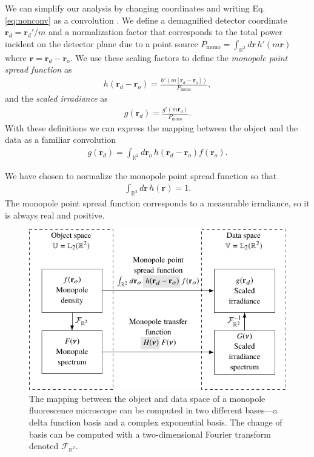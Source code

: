 \documentclass[]{osa-article}
\providecommand{\mb}[1]{\mathbf{#1}}
\providecommand{\ro}{\mathbf{\mathbf{r}}_o}
\providecommand{\rd}{\mathbf{r}_d}
\providecommand{\mbb}[1]{\mathbb{#1}}
\begin{document}
We can simplify our analysis by changing coordinates and writing Eq.
\eqref{eq:nonconv} as a convolution \cite[ch.~7.2.7]{barrett2004}. We
define a demagnified detector coordinate $\rd = \rd'/m$ and a normalization
factor that corresponds to the total power incident on the detector plane due to
a point source $P_{\text{mono}} = \int_{\mbb{R}^2}d\mb{r}\,h'(m\mb{r})$ where
$\mb{r} = \rd - \ro$. We use these scaling factors to define the
\textit{monopole point spread function} as
\begin{align}
  h(\rd - \ro) = \frac{h'(m[\rd - \ro])}{P_{\text{mono}}},
\end{align}
and the \textit{scaled irradiance} as
\begin{align}
  g(\rd) = \frac{g'(m\rd)}{P_{\text{mono}}}.
\end{align}
With these definitions we can express the mapping between the object and the
data as a familiar convolution
\begin{align}
  g(\rd) = \int_{\mbb{R}^2}d\ro\, h(\rd - \ro)f(\ro).  \label{eq:lsi}
\end{align}

We have chosen to normalize the monopole point spread function so that
\begin{align}
  \int_{\mbb{R}^2}d\mb{r}\, h(\mb{r}) = 1. \label{eq:norm}
\end{align}
The monopole point spread function corresponds to a measurable irradiance, so it
is always real and positive.

\begin{figure}
  \centering
  \includegraphics[scale=1.0]{../figures/monopole-block/monopole-block.pdf}
  \caption{The mapping between the object and data space of a monopole
    fluorescence microscope can be computed in two different bases---a delta
    function basis and a complex exponential basis. The change of basis can be
    computed with a two-dimensional Fourier transform denoted
    $\mathcal{F}_{\mbb{R}^2}$.}
     \label{fig:monopole-block}      
\end{figure}
\end{document}
